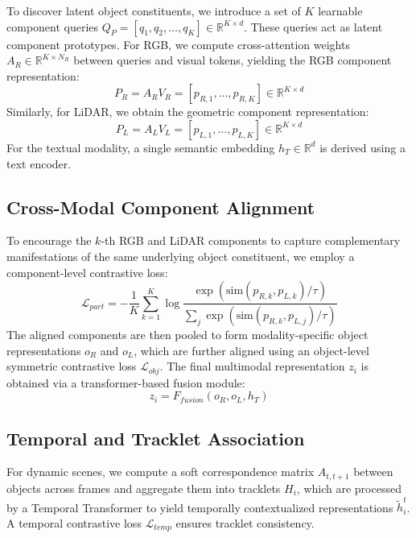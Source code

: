 \documentclass[letterpaper]{article}
\begin{document}
To discover latent object constituents, we introduce a set of $K$ learnable component queries $Q_P = [q_1, q_2, \dots, q_K] \in \mathbb{R}^{K \times d}$. These queries act as latent component prototypes. 
For RGB, we compute cross-attention weights $A_R \in \mathbb{R}^{K \times N_R}$ between queries and visual tokens, yielding the RGB component representation:
\begin{equation}
P_R = A_R V_R = [p_{R,1}, \dots, p_{R,K}] \in \mathbb{R}^{K \times d}
\end{equation}
Similarly, for LiDAR, we obtain the geometric component representation:
\begin{equation}
P_L = A_L V_L = [p_{L,1}, \dots, p_{L,K}] \in \mathbb{R}^{K \times d}
\end{equation}
For the textual modality, a single semantic embedding $h_T \in \mathbb{R}^d$ is derived using a text encoder.

\subsection{Cross-Modal Component Alignment}
To encourage the $k$-th RGB and LiDAR components to capture complementary manifestations of the same underlying object constituent, we employ a component-level contrastive loss:
\begin{equation}
\mathcal{L}_{part} = -\frac{1}{K} \sum_{k=1}^K \log \frac{\exp(\text{sim}(p_{R,k}, p_{L,k})/\tau)}{\sum_{j} \exp(\text{sim}(p_{R,k}, p_{L,j})/\tau)}
\end{equation}
The aligned components are then pooled to form modality-specific object representations $o_R$ and $o_L$, which are further aligned using an object-level symmetric contrastive loss $\mathcal{L}_{obj}$. The final multimodal representation $z_i$ is obtained via a transformer-based fusion module:
\begin{equation}
z_i = F_{fusion}(o_R, o_L, h_T)
\end{equation}

\subsection{Temporal and Tracklet Association}
For dynamic scenes, we compute a soft correspondence matrix $A_{t,t+1}$ between objects across frames and aggregate them into tracklets $H_i$, which are processed by a Temporal Transformer to yield temporally contextualized representations $\tilde{h}_i^t$. A temporal contrastive loss $\mathcal{L}_{temp}$ ensures tracklet consistency.
\end{document}
